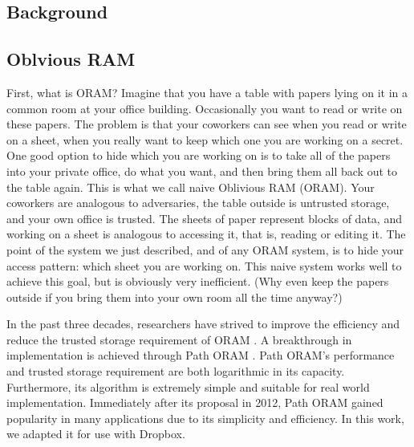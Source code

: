 \documentclass{article}
\begin{document}
\begin{multicols}{2}

\section{Background}

\subsection{Oblvious RAM}

First, what is ORAM? Imagine that you have a table with papers lying on it in a common room at your office building. Occasionally you want to read or write on these papers. The problem is that your coworkers can see when you read or write on a sheet, when you really want to keep which one you are working on a secret. One good option to hide which you are working on is to take all of the papers into your private office, do what you want, and then bring them all back out to the table again. This is what we call naive Oblivious RAM (ORAM). Your coworkers are analogous to adversaries, the table outside is untrusted storage, and your own office is trusted. The sheets of paper represent blocks of data, and working on a sheet is analogous to accessing it, that is, reading or editing it. The point of the system we just described, and of any ORAM system, is to hide your access pattern: which sheet you are working on. This naive system works well to achieve this goal, but is obviously very inefficient. (Why even keep the papers outside if you bring them into your own room all the time anyway?)
\par In the past three decades, researchers have strived to improve the efficiency and reduce the trusted storage requirement of ORAM \cite{Goldreich, Goodrich, Ostrovsky, Shi, Stefanov1}. A breakthrough in implementation is achieved through Path ORAM \cite{Stefanov2}. Path ORAM’s performance and trusted storage requirement are both logarithmic in its capacity. Furthermore, its algorithm is extremely simple and suitable for real world implementation. Immediately after its proposal in 2012, Path ORAM gained popularity in many applications due to its simplicity and efficiency. In this work, we adapted it for use with Dropbox.


\end{multicols}
\end{document}
